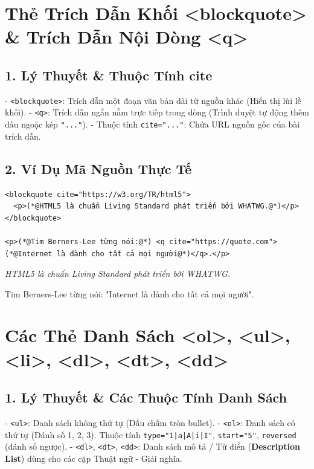\documentclass[11pt,oneside]{book}
\newcommand{\codeinline}[1]{\textcolor{accentOrange}{\texttt{#1}}}
\newcommand{\term}[1]{\textbf{\textcolor{primaryBlue}{#1}}}
\begin{document}
\section{Thẻ Trích Dẫn Khối <blockquote> \& Trích Dẫn Nội Dòng <q>}
\subsection{1. Lý Thuyết \& Thuộc Tính cite}
- \codeinline{<blockquote>}: Trích dẫn một đoạn văn bản dài từ nguồn khác (Hiển thị lùi lề khối).
- \codeinline{<q>}: Trích dẫn ngắn nằm trực tiếp trong dòng (Trình duyệt tự động thêm dấu ngoặc kép \codeinline{"..."}).
- Thuộc tính \codeinline{cite="..."}: Chứa URL nguồn gốc của bài trích dẫn.

\subsection{2. Ví Dụ Mã Nguồn Thực Tế}
\begin{codeWindow}
\begin{lstlisting}[language=HTML5]
<blockquote cite="https://w3.org/TR/html5">
  <p>(*@HTML5 là chuẩn Living Standard phát triển bởi WHATWG.@*)</p>
</blockquote>

<p>(*@Tim Berners-Lee từng nói:@*) <q cite="https://quote.com">(*@Internet là dành cho tất cả mọi người@*)</q>.</p>
\end{lstlisting}
\end{codeWindow}

\begin{browserWindow}
\sffamily\small
\begin{tcolorbox}[colback=primaryBlue!4, colframe=primaryBlue!40, leftrule=3pt, boxrule=0pt, arc=0pt]
\textit{HTML5 là chuẩn Living Standard phát triển bởi WHATWG.}
\end{tcolorbox}
Tim Berners-Lee từng nói: "Internet là dành cho tất cả mọi người".
\end{browserWindow}

\section{Các Thẻ Danh Sách <ol>, <ul>, <li>, <dl>, <dt>, <dd>}
\subsection{1. Lý Thuyết \& Các Thuộc Tính Danh Sách}
- \codeinline{<ul>}: Danh sách không thứ tự (Dấu chấm tròn bullet).
- \codeinline{<ol>}: Danh sách có thứ tự (Đánh số 1, 2, 3). Thuộc tính \codeinline{type="1|a|A|i|I"}, \codeinline{start="5"}, \codeinline{reversed} (đánh số ngược).
- \codeinline{<dl>}, \codeinline{<dt>}, \codeinline{<dd>}: Danh sách mô tả / Từ điển (\term{Description List}) dùng cho các cặp Thuật ngữ - Giải nghĩa.
\end{document}
